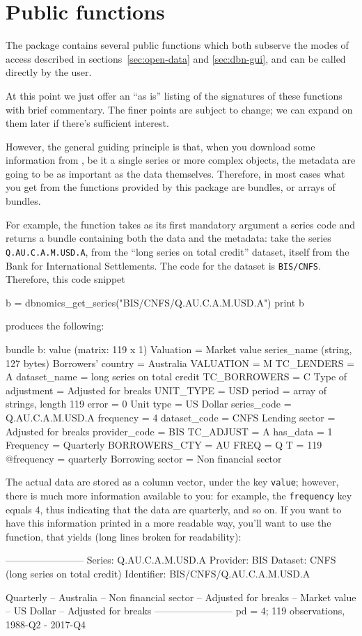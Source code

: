 \documentclass{article}
\begin{document}
\section{Public functions}
\label{sec:dbn-funcs}

The package contains several public functions which both subserve the
modes of access described in sections~\ref{sec:open-data} and
\ref{sec:dbn-gui}, and can be called directly by the user.

At this point we just offer an ``as is'' listing of the signatures of
these functions with brief commentary. The finer points are subject to
change; we can expand on them later if there's sufficient
interest.

However, the general guiding principle is that, when you download some
information from \DB, be it a single series or more
complex objects, the metadata are going to be as important as the data
themselves. Therefore, in most cases what you get from the functions
provided by this package are bundles, or arrays of bundles.

For example, the  function takes as its first
mandatory argument a series code and returns a bundle containing both
the data and the metadata: take the series \texttt{Q.AU.C.A.M.USD.A},
from the ``long series on total credit'' dataset, itself from the Bank
for International Settlements. The code for the dataset is
\texttt{BIS/CNFS}. Therefore, this code snippet
\begin{code}
  b = dbnomics_get_series("BIS/CNFS/Q.AU.C.A.M.USD.A")
  print b
\end{code}
produces the following:
\begin{code}
bundle b:
 value (matrix: 119 x 1)
 Valuation = Market value
 series_name (string, 127 bytes)
 Borrowers' country = Australia
 VALUATION = M
 TC_LENDERS = A
 dataset_name = long series on total credit
 TC_BORROWERS = C
 Type of adjustment = Adjusted for breaks
 UNIT_TYPE = USD
 period = array of strings, length 119
 error = 0
 Unit type = US Dollar
 series_code = Q.AU.C.A.M.USD.A
 frequency = 4
 dataset_code = CNFS
 Lending sector = Adjusted for breaks
 provider_code = BIS
 TC_ADJUST = A
 has_data = 1
 Frequency = Quarterly
 BORROWERS_CTY = AU
 FREQ = Q
 T = 119
 @frequency = quarterly
 Borrowing sector = Non financial sector
\end{code}
The actual data are stored as a column vector, under the key
\texttt{value}; however, there is much more information available to
you: for example, the \texttt{frequency} key equals 4, thus indicating
that the data are quarterly, and so on. If you want to have this
information printed in a more readable way, you'll want to use the
 function, that yields (long lines broken for
readability):
\begin{code}
------------------------
Series: Q.AU.C.A.M.USD.A
Provider: BIS
Dataset: CNFS (long series on total credit)
Identifier: BIS/CNFS/Q.AU.C.A.M.USD.A

Quarterly – Australia – Non financial sector – Adjusted for breaks –
   Market value – US Dollar – Adjusted for breaks
------------------------
pd = 4; 119 observations, 1988-Q2 - 2017-Q4
\end{code}
\end{document}
